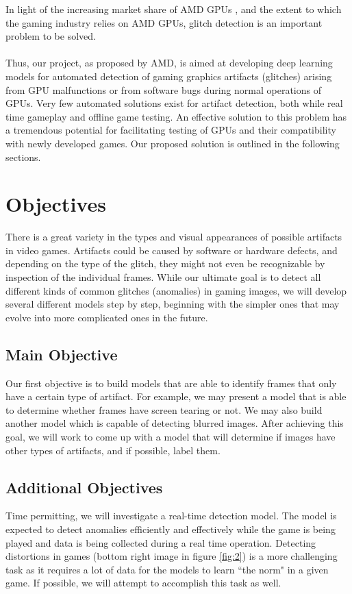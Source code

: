 \documentclass[12pt]{article}
\begin{document}

\noindent In light of the increasing market share of AMD GPUs \cite{amd}, and the extent to which the gaming industry relies on AMD GPUs, glitch detection is an important problem to be solved.\\\hspace{\fill}\\
Thus, our project, as proposed by AMD, is aimed at developing deep learning models for automated detection of gaming graphics artifacts (glitches) arising from GPU malfunctions or from software bugs during normal operations of GPUs. Very few automated solutions exist for artifact detection, both while real time gameplay and offline game testing.  An effective solution to this problem  has a tremendous potential for facilitating testing of GPUs and their compatibility with newly developed games. Our proposed solution is outlined in the following sections. 

\section{Objectives}
\noindent There is a great variety in the types and visual appearances of possible artifacts in video games. Artifacts could be caused by software or hardware defects, and depending on the type of the glitch, they might not even be recognizable by inspection of the individual frames. While our ultimate goal is to detect all different kinds of common glitches (anomalies) in gaming images, we will develop several different models step by step, beginning with the simpler ones that may evolve into more  complicated ones in the future. 

\subsection{Main Objective}
Our first objective is to build models that are able to identify frames that only have a certain type of artifact. For example, we may present a model that is able to determine whether frames have screen tearing or not. We may also build another model which is capable of detecting blurred images. After achieving this goal, we will work to come up with a model that will determine if images have other types of  artifacts, and if possible, label them.

\subsection{Additional Objectives}
Time permitting, we will investigate a real-time detection model. The model is expected to detect anomalies efficiently and effectively while the game is being played and data is being collected during a real time operation. Detecting distortions in games (bottom right image in figure \ref{fig:2}) is a more challenging task as it requires a lot of data for the models to learn ``the norm" in a given game. If possible, we will attempt to accomplish this task as well.\\ 
\end{document}
